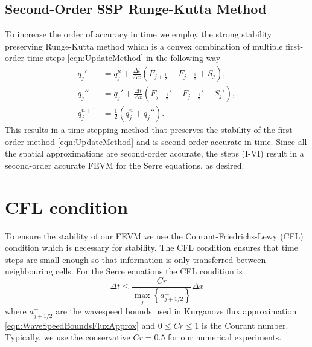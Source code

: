 \subsection{Second-Order SSP Runge-Kutta Method}
To increase the order of accuracy in time we employ the strong stability preserving Runge-Kutta method \cite{Gottlieb-etal-2003-89} which is a convex combination of multiple first-order time steps \eqref{eqn:UpdateMethod} in the following way
\begin{subequations}
\begin{align}
\overline{q}_j' &= \overline{q}^{n}_j + \frac{\Delta t}{\Delta x} \left(F_{j+\frac{1}{2}} - F_{j-\frac{1}{2}} + S_j\right),\\
\overline{q}_j'' &= \overline{q}_j' + \frac{\Delta t}{\Delta x} \left(F_{j+\frac{1}{2}}' - F_{j-\frac{1}{2}}'  + S_j' \right), \\
\overline{q}^{n+1}_j &= \frac{1}{2} \left( \overline{q}^n_j +  \overline{q}_j'' \right).
\end{align}
\label{eqn:SSPRKStep1}
\end{subequations}
This results in a time stepping method that preserves the stability of the first-order method \eqref{eqn:UpdateMethod} and is second-order accurate in time. Since all the spatial approximations are second-order accurate, the steps (I-VI) result in a second-order accurate FEVM for the Serre equations, as desired. 

\setcounter{subsection}{0}
\renewcommand{\thesubsection}{\thechapter.\arabic{section}.\arabic{subsection}} 

\section{CFL condition}
To ensure the stability of our FEVM we use the Courant-Friedrichs-Lewy (CFL) condition \cite{Courant-etal-1967-215} which is necessary for stability. The CFL condition ensures that time steps are small enough so that information is only transferred between neighbouring cells. For the Serre equations the CFL condition is 
\begin{equation}
\Delta t \le \frac{Cr }{\max_{j} \left\lbrace a^\pm_{j+1/2} \right\rbrace} \Delta x
\label{eqn:CFLcond}
\end{equation}
where $a^\pm_{j+1/2} $ are the wavespeed bounds used in Kurganovs flux approximation \eqref{eqn:WaveSpeedBoundsFluxApprox} and $0\le Cr \le 1$ is the Courant number. Typically, we use the conservative $Cr = 0.5$ for our numerical experiments. 

